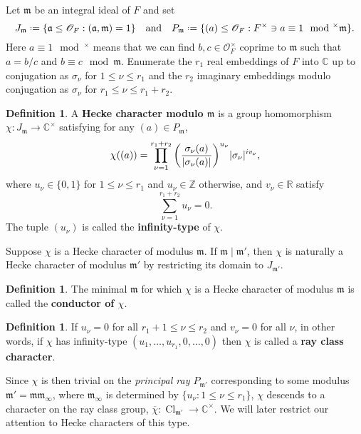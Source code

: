 \documentclass[11pt,a4paper]{article}
\let\mf\mathfrak
\newcommand{\Z}{\mathbb{Z}}
\newcommand{\R}{\mathbb{R}}
\newcommand{\C}{\mathbb{C}}
\renewcommand{\O}{\mathscr{O}}
\newcommand*{\defeq}{\mathrel{\vcenter{\baselineskip0.5ex \lineskiplimit0pt
      \hbox{\scriptsize.}\hbox{\scriptsize.}}}%
  =}
\renewcommand{\bar}{\overline}
\DeclareMathOperator{\Cl}{Cl}
\theoremstyle{plain}
\theoremstyle{definition}
\newtheorem{mydef}[thm]{Definition}
\theoremstyle{remark}
\numberwithin{equation}{section}
\begin{document}
  Let $\mf m$ be an integral ideal of $F$ and set
  \begin{equation}
    \label{eq:17}
     J_{\mf m} \defeq \{ \mf a \leq \O_{F} : (\mf a, \mf m) = 1\}
     \qq{and} P_{\mf m} \defeq \{ (a) \leq \O_{F} : F^{\times} \ni a \equiv 1 \mod^{\times}\mf m\}.
   \end{equation}
   Here $a \equiv 1 \mod^{\times}$ means that we can find
   $b,c \in \O_{F}^{\times}$ coprime to $\mf m$ such that $a = b/c$ and $b \equiv
   c \mod \mf m$. Enumerate the $r_{1}$ real embeddings of $F$ into $\C$ up
   to conjugation as $\sigma_{\nu}$ for $1 \le \nu \le r_{1}$ and the $r_{2}$ imaginary
   embeddings modulo conjugation
   as $\sigma_{\nu}$ for $r_{1} \le \nu \le r_{1}+r_{2}$. 
\begin{mydef}
  A \textbf{Hecke character modulo $\mf m$} is a group homomorphism $\chi \colon J_{\mf
    m}\to \C^{\times}$ satisfying for any $(a) \in P_{\mf m}$,
  \begin{equation}
    \label{eq:19}
    \chi((a)) = \prod_{\nu =1}^{r_{1}+r_{2}}\qty(\frac{\sigma_{\nu}(a)}{|\sigma_{\nu}(a)|})^{u_{\nu}} |\sigma_{\nu}|^{iv_{\nu}},
  \end{equation}
  where $u_{\nu} \in \{0,1\}$ for $1 \le \nu\le r_{1}$ and $u_{\nu} \in \Z$
  otherwise, and $v_{\nu}\in \R$ satisfy
  \begin{equation}
    \label{eq:20}
    \sum_{\nu=1}^{r_{1}+r_{2}} u_{\nu} = 0.
  \end{equation}
  The tuple $(u_{\nu})$ is called the \textbf{infinity-type} of $\chi$.
\end{mydef}
Suppose $\chi$ is a Hecke character of modulus $\mf m$. If
$\mf m \mid \mf m'$, then $\chi$ is naturally a Hecke character of modulus
$\mf m'$ by restricting its domain to $J_{\mf m'}$. 
\begin{mydef}
  The minimal $\mf m$ for which $\chi$ is a Hecke character of modulus
  $\mf m$ is called the
  \textbf{conductor of $\chi$}.
\end{mydef}

\begin{mydef}
  If $u_{\nu} = 0$ for all $r_{1}+1 \le \nu \le r_{2}$ and
  $v_{\nu}= 0$ for all $\nu$, in other words, if $\chi$ has infinity-type
  $(u_{1},\ldots, u_{r_{1}},0,\ldots, 0)$ then $\chi$ is called a \textbf{ray class
    character}.
\end{mydef}

Since $\chi$ is then trivial on the \emph{principal ray $P_{\mf m'}$}
corresponding to some modulus $\mf m' = \mf m \mf m_{\infty}$,
where $\mf m_{\infty}$ is determined by $\{u_{\nu} : 1\le \nu \le r_{1}\}$, $\chi$
descends to a character on the ray class group, $\bar \chi\colon \Cl_{\mf
  m'} \to \C^{\times}$. We will later restrict our attention to Hecke
characters of this type. 
\end{document}
